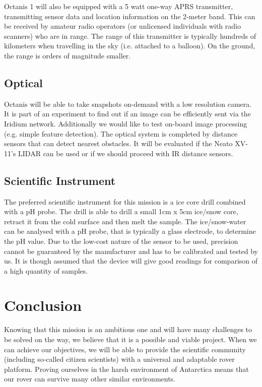 \documentclass[a4paper,12pt]{article}
\begin{document}
Octanis 1 will also be equipped with a 5 watt one-way APRS transmitter, transmitting sensor data and location information on the 2-meter band. This can be received by amateur radio operators (or unlicensed individuals with radio scanners) who are in range. The range of this transmitter is typically hundreds of kilometers when travelling in the sky (i.e. attached to a balloon). On the ground, the range is orders of magnitude smaller.


\subsection{Optical}
Octanis will be able to take snapshots on-demand with a low resolution camera. It is part of an experiment to find out if an image can be efficiently sent via the Iridium network. Additionally we would like to test on-board image processing (e.g. simple feature detection). The optical system is completed by distance sensors that can detect nearest obstacles. It will be evaluated if the Neato XV-11's LIDAR \cite{lidar} can be used or if we should proceed with IR distance sensors.


\subsection{Scientific Instrument}
The preferred scientific instrument for this mission is a ice core drill combined with a pH probe. The drill is able to drill a small 1cm x 5cm ice/snow core, retract it from the cold surface and then melt the sample. The ice/snow-water can be analysed with a pH probe, that is typically a glass electrode, to determine the pH value. Due to the low-cost nature of the sensor to be used, precision cannot be guaranteed by the manufacturer and has to be calibrated and tested by us. It is though assumed that the device will give good readings for comparison of a high quantity of samples.

\pagebreak

\section{Conclusion}
Knowing that this mission is an ambitious one and will have many challenges to be solved on the way, we believe that it is a possible and viable project. When we can achieve our objectives, we will be able to provide the scientific community (including so-called citizen scientists) with a universal and adaptable rover platform. Proving ourselves in the harsh environment of Antarctica means that our rover can survive many other similar environments. \\
\end{document}

